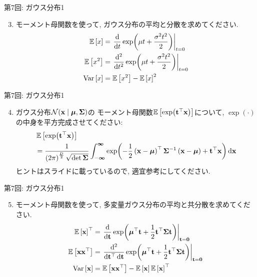 \documentclass[dvipdfmx,notheorems,t]{beamer}
\begin{document}
\begin{frame}{第7回: ガウス分布1}
\begin{enumerate}
  \setcounter{enumi}{2}
  \item モーメント母関数を使って, ガウス分布の平均と分散を求めてください.
  \begin{align*}
    \operatorname{\mathbb{E}} \left[ x \right] &= \left. \dv{t} \exp(\mu t + \frac{\sigma^2 t^2}{2}) \right|_{t = 0} \\
    \operatorname{\mathbb{E}} \left[ x^2 \right] &= \left. \dv[2]{t} \exp(\mu t + \frac{\sigma^2 t^2}{2}) \right|_{t = 0} \\
    \operatorname{Var} \left[ x \right] &= \operatorname{\mathbb{E}} \left[ x^2 \right] - \operatorname{\mathbb{E}} \left[ x \right]^2
  \end{align*}
\end{enumerate}
\end{frame}

\begin{frame}{第7回: ガウス分布1}
\begin{enumerate}
  \setcounter{enumi}{3}
  \item ガウス分布$\mathcal{N}(\vb{x} \mid \vb*{\mu}, \vb{\Sigma})$の
  モーメント母関数$\operatorname{\mathbb{E}} \left[ \exp(\vb{t}^\top \vb{x}) \right]$について,
  $\exp(\cdot)$の中身を平方完成させてください:
  \begin{align*}
    & \operatorname{\mathbb{E}} \left[ \exp(\vb{t}^\top \vb{x}) \right] \\
    &= \frac{1}{\left( 2\pi \right)^\frac{D}{2} \sqrt{\det \vb{\Sigma}}}
      \int_{-\boldsymbol{\infty}}^{\boldsymbol{\infty}}
      \exp(-\frac{1}{2} \left( \vb{x} - \vb*{\mu} \right)^\top \vb{\Sigma}^{-1}
        \left( \vb{x} - \vb*{\mu} \right) + \vb{t}^\top \vb{x}) \dd{\vb{x}}
  \end{align*}
  ヒントはスライドに載っているので, 適宜参考にしてください.
\end{enumerate}
\end{frame}

\begin{frame}{第7回: ガウス分布1}
\begin{enumerate}
  \setcounter{enumi}{4}
  \item モーメント母関数を使って, 多変量ガウス分布の平均と共分散を求めてください.
  \begin{align*}
    \operatorname{\mathbb{E}} \left[ \vb{x} \right]^\top
    &= \left. \dv{\vb{t}} \exp(\vb*{\mu}^\top \vb{t} + \frac{1}{2} \vb{t}^\top \vb{\Sigma} \vb{t})
      \right|_{\vb{t} = \vb{0}} \\
    \operatorname{\mathbb{E}} \left[ \vb{x} \vb{x}^\top \right]
    &= \left. \frac{\dd[2]}{\dd{\vb{t}^\top} \dd{\vb{t}}}
      \exp(\vb*{\mu}^\top \vb{t} + \frac{1}{2} \vb{t}^\top \vb{\Sigma} \vb{t})
      \right|_{\vb{t} = \vb{0}} \\
    \operatorname{Var} \left[ \vb{x} \right] &= \operatorname{\mathbb{E}} \left[ \vb{x} \vb{x}^\top \right] - \operatorname{\mathbb{E}} \left[ \vb{x} \right] \operatorname{\mathbb{E}} \left[ \vb{x} \right]^\top
  \end{align*}
\end{enumerate}
\end{frame}
\end{document}
